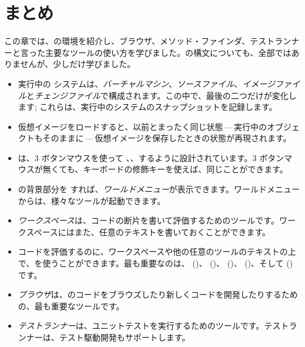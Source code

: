 \documentclass[a4paper,10pt,twoside]{book}
\begin{document}
\section{まとめ}
この章では、\pharo の環境を紹介し、ブラウザ、メソッド・ファインダ、テストランナーと言った主要なツールの使い方を学びました。\pharo の構文についても、全部ではありませんが、少しだけ学びました。
\begin{itemize}
  \item 実行中の \pharo システムは、\emph{バーチャルマシン}、\emph{ソースファイル}、\emph{イメージファイル}と\emph{チェンジファイル}で構成されます。この中で、最後の二つだけが変化します; これらは、実行中のシステムのスナップショットを記録します。
  \item \pharo 仮想イメージをロードすると、以前とまったく同じ状態\,---\,実行中のオブジェクトもそのままに\,---\,仮想イメージを保存したときの状態が再現されます。
  \item \pharo は、3 ボタンマウスを使って \click、\actclick、\metaclick するように設計されています。3 ボタンマウスが無くても、キーボードの修飾キーを使えば、同じことができます。
  \item \pharo の背景部分を \click すれば、\emph{ワールドメニュー}が表示できます。ワールドメニューからは、様々なツールが起動できます。
  \item \emph{ワークスペース}は、コードの断片を書いて評価するためのツールです。ワークスペースにはまた、任意のテキストを書いておくことができます。
  \item コードを評価するのに、ワークスペースや他の任意のツールのテキストの上で、を使うことができます。最も重要なのは、 ()、 ()、 ()、 ()、そして  ()です。
  \item \emph{ブラウザ}は、\pharo のコードをブラウズしたり新しくコードを開発したりするための、最も重要なツールです。
  \item \emph{テストランナー}は、ユニットテストを実行するためのツールです。テストランナーは、テスト駆動開発もサポートします。
\end{itemize}

\ifx\wholebook\relax\else 
   
   
\end{document}
